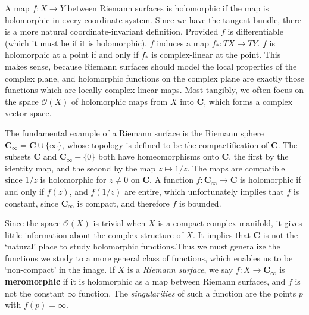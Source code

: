 A map $f: X \to Y$ between Riemann surfaces is holomorphic if the map is holomorphic in every coordinate system. Since we have the tangent bundle, there is a more natural coordinate-invariant definition. Provided $f$ is differentiable (which it must be if it is holomorphic), $f$ induces a map $f_*: TX \to TY$. $f$ is holomorphic at a point if and only if $f_*$ is complex-linear at the point. This makes sense, because Riemann surfaces should model the local properties of the complex plane, and holomorphic functions on the complex plane are exactly those functions which are locally complex linear maps. Most tangibly, we often focus on the space $\mathcal{O}(X)$ of holomorphic maps from $X$ into $\mathbf{C}$, which forms a complex vector space.

\begin{example}
    The fundamental example of a Riemann surface is the Riemann sphere $\mathbf{C}_\infty = \mathbf{C} \cup \{ \infty \}$, whose topology is defined to be the compactification of $\mathbf{C}$. The subsets $\mathbf{C}$ and $\mathbf{C}_\infty - \{ 0 \}$ both have homeomorphisms onto $\mathbf{C}$, the first by the identity map, and the second by the map $z \mapsto 1/z$. The maps are compatible since $1/z$ is holomorphic for $z \neq 0$ on $\mathbf{C}$. A function $f: \mathbf{C}_\infty \to \mathbf{C}$ is holomorphic if and only if $f(z)$, and $f(1/z)$ are entire, which unfortunately implies that $f$ is constant, since $\mathbf{C}_\infty$ is compact, and therefore $f$ is bounded.
\end{example}

Since the space $\mathcal{O}(X)$ is trivial when $X$ is a compact complex manifold, it gives little information about the complex structure of $X$. It implies that $\mathbf{C}$ is not the `natural' place to study holomorphic functions.Thus we must generalize the functions we study to a more general class of functions, which enables us to be `non-compact' in the image. If $X$ is a {\it Riemann surface}, we say $f: X \to \mathbf{C}_\infty$ is {\bf meromorphic} if it is holomorphic as a map between Riemann surfaces, and $f$ is not the constant $\infty$ function. The {\it singularities} of such a function are the points $p$ with $f(p) = \infty$.


